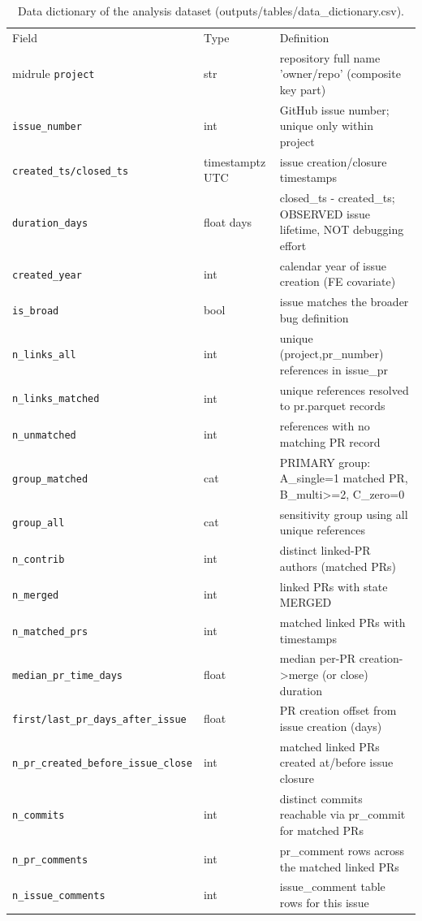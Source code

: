 \begin{table}[t]
\centering
\caption{Data dictionary of the analysis dataset (outputs/tables/data\_dictionary.csv).\label{tab:datadic}}
\small \begin{tabular}{@{}llp{}@{}}
\toprule
Field & Type & Definition \\midrule
\texttt{project} & str & repository full name 'owner/repo' (composite key part) \\
\texttt{issue\_number} & int & GitHub issue number; unique only within project \\
\texttt{created\_ts/closed\_ts} & timestamptz UTC & issue creation/closure timestamps \\
\texttt{duration\_days} & float days & closed\_ts - created\_ts; OBSERVED issue lifetime, NOT debugging effort \\
\texttt{created\_year} & int & calendar year of issue creation (FE covariate) \\
\texttt{is\_broad} & bool & issue matches the broader bug definition \\
\texttt{n\_links\_all} & int & unique (project,pr\_number) references in issue\_pr \\
\texttt{n\_links\_matched} & int & unique references resolved to pr.parquet records \\
\texttt{n\_unmatched} & int & references with no matching PR record \\
\texttt{group\_matched} & cat & PRIMARY group: A\_single=1 matched PR, B\_multi>=2, C\_zero=0 \\
\texttt{group\_all} & cat & sensitivity group using all unique references \\
\texttt{n\_contrib} & int & distinct linked-PR authors (matched PRs) \\
\texttt{n\_merged} & int & linked PRs with state MERGED \\
\texttt{n\_matched\_prs} & int & matched linked PRs with timestamps \\
\texttt{median\_pr\_time\_days} & float & median per-PR creation->merge (or close) duration \\
\texttt{first/last\_pr\_days\_after\_issue} & float & PR creation offset from issue creation (days) \\
\texttt{n\_pr\_created\_before\_issue\_close} & int & matched linked PRs created at/before issue closure \\
\texttt{n\_commits} & int & distinct commits reachable via pr\_commit for matched PRs \\
\texttt{n\_pr\_comments} & int & pr\_comment rows across the matched linked PRs \\
\texttt{n\_issue\_comments} & int & issue\_comment table rows for this issue \\
\bottomrule
\end{tabular}
\end{table}
